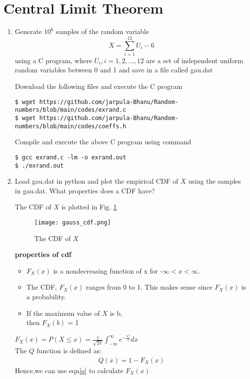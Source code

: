 \documentclass[journal,12pt,twocolumn]{IEEEtran}
\renewcommand\thesection{\arabic{section}}
\begin{document}
\section{Central Limit Theorem}
%
\begin{enumerate}[label=\thesection.\arabic*
,ref=\thesection.\theenumi]

%
\item
Generate $10^6$ samples of the random variable
%
\begin{equation}
X = \sum_{i=1}^{12}U_i -6
\end{equation}
%
using a C program, where $U_i, i = 1,2,\dots, 12$ are  a set of independent uniform random variables between 0 and 1
and save in a file called gau.dat

\solution
Download the following files and execute the C program
\begin{lstlisting}
$ wget https://github.com/jarpula-Bhanu/Random-numbers/blob/main/codes/exrand.c
$ wget https://github.com/jarpula-Bhanu/Random-numbers/blob/main/codes/coeffs.h
\end{lstlisting}
Compile and execute the above C program using command
\begin{lstlisting}
$ gcc exrand.c -lm -o exrand.out
$ ./exrand.out
\end{lstlisting}
%
\item
Load gau.dat in python and plot the empirical CDF of $X$ using the samples in gau.dat. What properties does a CDF have?

\solution The CDF of $X$ is plotted in Fig. \ref{fig:gauss_cdf}
\begin{figure}[h]
    \centering
    \texttt{[image: gauss\_cdf.png]}
    \caption{The CDF of $X$}
    \label{fig:gauss_cdf}
\end{figure}
\textbf{properties of cdf}
\begin{itemize}
    \item $F_X(x)$ is a nondecreasing function of x for -$\infty < x < \infty$. 
    \item The CDF, $F_X(x)$ ranges from 0 to 1. This makes sense since $F_X(x)$ is a probability.
    \item If the maximum value of $X$ is b, \\then $F_X(b)$ = 1 \\
\end{itemize} 
$F_X(x) = P(X\le x) = \frac{1}{\sqrt{2\pi}}\int_{-\infty}^{\infty}e^{-\frac{x^2}{2}} dx$\\
The $Q$ function is defined as:
\begin{align}\label{q}
    Q(x) = 1 - F_X(x)
\end{align}
Hence,we can use eqn\eqref{q} to calculate $F_X(x)$\\



\end{enumerate}
\end{document}
